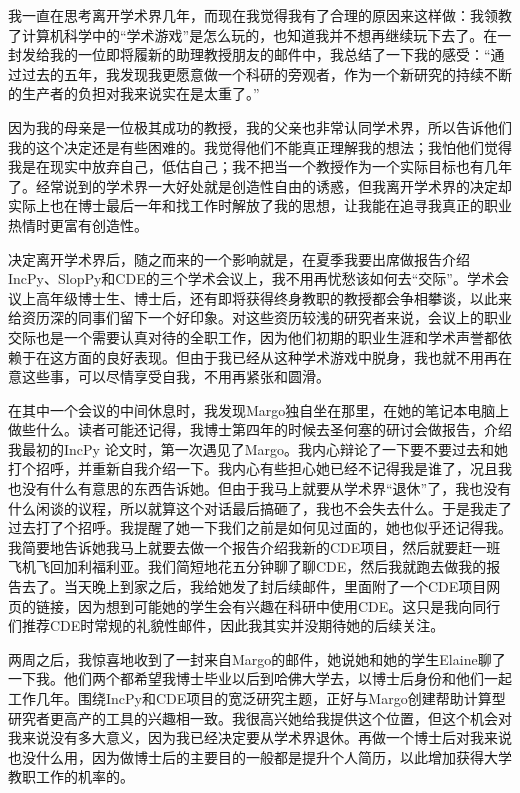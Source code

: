 \documentclass[letter,12pt]{book}
\begin{document}
\begin{CJK}{UTF8}{gbsn}
我一直在思考离开学术界几年，而现在我觉得我有了合理的原因来这样做：我领教了计算机科学中的“学术游戏”是怎么玩的，也知道我并不想再继续玩下去了。在一封发给我的一位即将履新的助理教授朋友的邮件中，我总结了一下我的感受：“通过过去的五年，我发现我更愿意做一个科研的旁观者，作为一个新研究的持续不断的生产者的负担对我来说实在是太重了。”

因为我的母亲是一位极其成功的教授，我的父亲也非常认同学术界，所以告诉他们我的这个决定还是有些困难的。我觉得他们不能真正理解我的想法；我怕他们觉得我是在现实中放弃自己，低估自己；我不把当一个教授作为一个实际目标也有几年了。经常说到的学术界一大好处就是创造性自由的诱惑，但我离开学术界的决定却实际上也在博士最后一年和找工作时解放了我的思想，让我能在追寻我真正的职业热情时更富有创造性。

\breakline

决定离开学术界后，随之而来的一个影响就是，在夏季我要出席做报告介绍IncPy、SlopPy和CDE的三个学术会议上，我不用再忧愁该如何去“交际”。学术会议上高年级博士生、博士后，还有即将获得终身教职的教授都会争相攀谈，以此来给资历深的同事们留下一个好印象。对这些资历较浅的研究者来说，会议上的职业交际也是一个需要认真对待的全职工作，因为他们初期的职业生涯和学术声誉都依赖于在这方面的良好表现。但由于我已经从这种学术游戏中脱身，我也就不用再在意这些事，可以尽情享受自我，不用再紧张和圆滑。

在其中一个会议的中间休息时，我发现Margo独自坐在那里，在她的笔记本电脑上做些什么。读者可能还记得，我博士第四年的时候去圣何塞的研讨会做报告，介绍我最初的IncPy 论文时，第一次遇见了Margo。我内心辩论了一下要不要过去和她打个招呼，并重新自我介绍一下。我内心有些担心她已经不记得我是谁了，况且我也没有什么有意思的东西告诉她。但由于我马上就要从学术界“退休”了，我也没有什么闲谈的议程，所以就算这个对话最后搞砸了，我也不会失去什么。于是我走了过去打了个招呼。我提醒了她一下我们之前是如何见过面的，她也似乎还记得我。我简要地告诉她我马上就要去做一个报告介绍我新的CDE项目，然后就要赶一班飞机飞回加利福利亚。我们简短地花五分钟聊了聊CDE，然后我就跑去做我的报告去了。当天晚上到家之后，我给她发了封后续邮件，里面附了一个CDE项目网页的链接，因为想到可能她的学生会有兴趣在科研中使用CDE。这只是我向同行们推荐CDE时常规的礼貌性邮件，因此我其实并没期待她的后续关注。

两周之后，我惊喜地收到了一封来自Margo的邮件，她说她和她的学生Elaine聊了一下我。他们两个都希望我博士毕业以后到哈佛大学去，以博士后身份和他们一起工作几年。围绕IncPy和CDE项目的宽泛研究主题，正好与Margo创建帮助计算型研究者更高产的工具的兴趣相一致。我很高兴她给我提供这个位置，但这个机会对我来说没有多大意义，因为我已经决定要从学术界退休。再做一个博士后对我来说也没什么用，因为做博士后的主要目的一般都是提升个人简历，以此增加获得大学教职工作的机率的。


\end{CJK}
\end{document}
